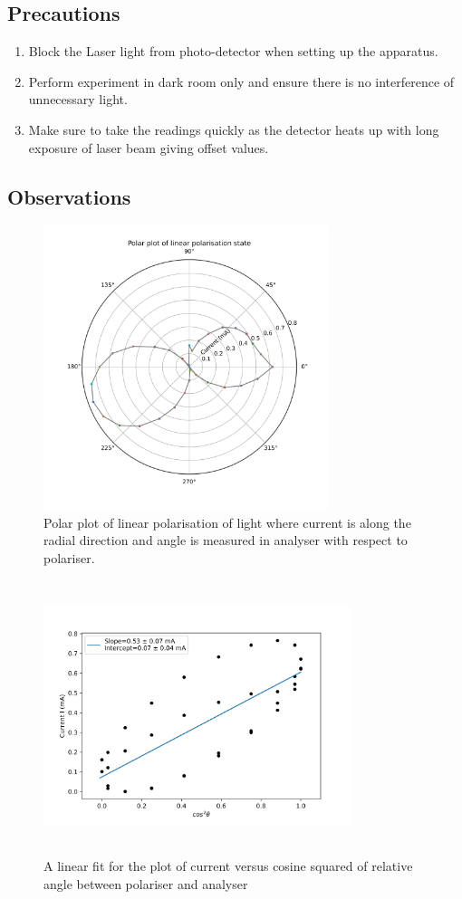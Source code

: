 \documentclass[a4paper, amsfonts, amssymb, amsmath, reprint, showkeys, nofootinbib, twoside]{revtex4-1}
\begin{document}
\subsection{Precautions}
\begin{enumerate}
\item{Block the Laser light from photo-detector when setting up the apparatus.}
\item{Perform experiment in dark room only and ensure there is no interference of unnecessary light.}
\item {Make sure to take the readings quickly as the detector heats up with long exposure of laser beam giving offset values.}
\end{enumerate}

\subsection{Observations}
\begin{figure}[H] %
	\centering
	\includegraphics[width=8.3cm,height=8.3cm]{4} 
	\caption{Polar plot of linear polarisation of light where current is along the radial direction and angle is measured in analyser with respect to polariser.}
	\label{4}
\end{figure}

\begin{figure}[H] %
	\centering
	\includegraphics[width=9cm,height=8cm]{5} 
	\caption{A linear fit for the plot of current versus cosine squared of relative angle between polariser and analyser }
	\label{5}
\end{figure}
\end{document}
